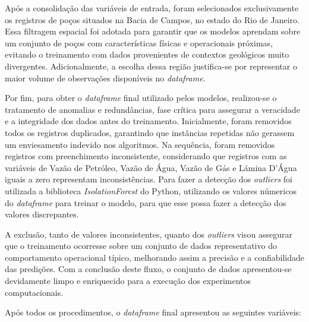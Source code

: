 Após a consolidação das variáveis de entrada, foram selecionados exclusivamente os registros de poços situados na Bacia de Campos, no estado do Rio de Janeiro. Essa filtragem espacial foi adotada para garantir que os modelos aprendam sobre um conjunto de poços com características físicas e operacionais próximas, evitando o treinamento com dados provenientes de contextos geológicos muito divergentes. Adicionalmente, a escolha dessa região justifica-se por representar o maior volume de observações disponíveis no \textit{dataframe}.

Por fim, para obter o \textit{dataframe} final utilizado pelos modelos, realizou-se o tratamento de anomalias e redundâncias, fase crítica para assegurar a veracidade e a integridade dos dados antes do treinamento. Inicialmente, foram removidos todos os registros duplicados, garantindo que instâncias repetidas não gerassem um enviesamento indevido nos algoritmos. Na sequência, foram removidos registros com preenchimento inconsistente, considerando que registros com as variáveis de Vazão de Petróleo, Vazão de Água, Vazão de Gás e Lámina D'Água iguais a zero representam inconsistências. Para fazer a detecção dos \textit{outliers} foi utilizada a biblioteca \textit{IsolationForest} do Python, utilizando os valores númericos do \textit{dataframe} para treinar o modelo, para que esse possa fazer a detecção dos valores discrepantes.

A exclusão, tanto de valores inconsistentes, quanto dos \textit{outliers} visou assegurar que o treinamento ocorresse sobre um conjunto de dados representativo do comportamento operacional típico, melhorando assim a precisão e a confiabilidade das predições. Com a conclusão deste fluxo, o conjunto de dados apresentou-se devidamente limpo e enriquecido para a execução dos experimentos computacionais.

Após todos os procedimentos, o \textit{dataframe} final apresentou as seguintes variáveis:

